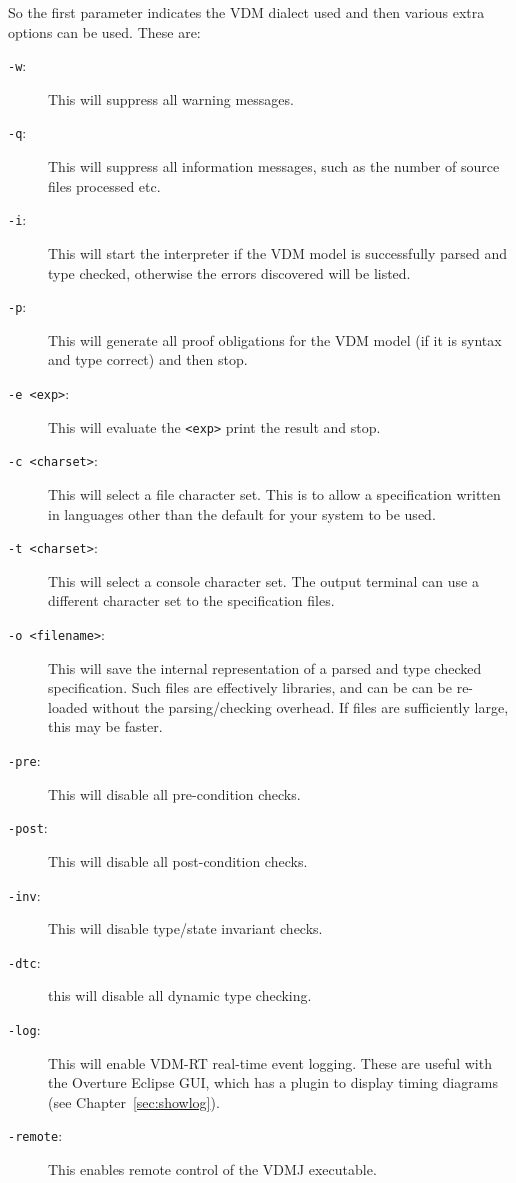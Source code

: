\documentclass{overturerepchap}
\begin{document}
So the first parameter indicates the VDM dialect used and then
various extra options can be used. These are:

\begin{description}
\item[\texttt{-w}:] This will suppress all warning messages.
\item[\texttt{-q}:] This will suppress all information messages, such as
 the number of source files processed etc.
\item[\texttt{-i}:] This will start the interpreter if the VDM
  model is successfully parsed and type checked, otherwise the errors discovered
  will be listed.
\item[\texttt{-p}:] This will generate all proof obligations for the
  VDM model (if it is syntax and type correct) and then 
  stop.
\item[\texttt{-e <exp>}:] This will evaluate the \texttt{<exp>} print
  the result and stop.
\item[\texttt{-c <charset>}:] This will select a file character set. This is to
allow a specification written in languages other than the default for your system
to be used. 
\item[\texttt{-t <charset>}:] This will select a console character set. The output
terminal can use a different character set to the specification files.
\item[\texttt{-o <filename>}:] This will save the internal
  representation of a parsed and type checked spe\-ci\-fication. Such files are
effectively libraries, and can be can be re-loaded without the
parsing/checking overhead. If files are sufficiently large, this may be faster.
\item[\texttt{-pre}:] This will disable all pre-condition checks.
\item[\texttt{-post}:] This will disable all post-condition checks.
\item[\texttt{-inv}:] This will disable type/state invariant checks.
\item[\texttt{-dtc}:] this will disable all dynamic type checking.
\item[\texttt{-log}:] This will enable VDM-RT real-time event logging. These
  are useful with the Overture Eclipse GUI, which has a plugin to
  display timing diagrams (see Chapter~\ref{sec:showlog}).
\item [\texttt{-remote}:] This enables remote control of the VDMJ executable.
\end{description}

\end{document}
